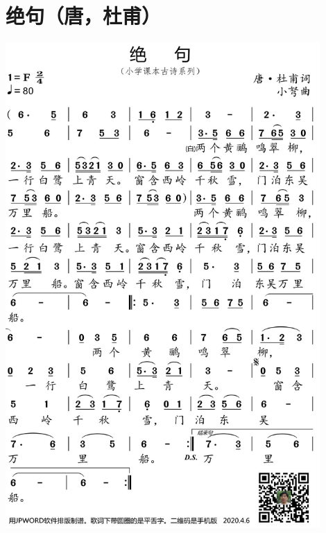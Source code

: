 \documentclass[cn,pad,chinesefont=nofont]{elegantbook}
\begin{document}
\section{绝句（唐，杜甫）}
    \includegraphics[width=0.9\textwidth]{dongxiao/20200627-古诗-杜甫-绝句.jpg}   
\end{document}
